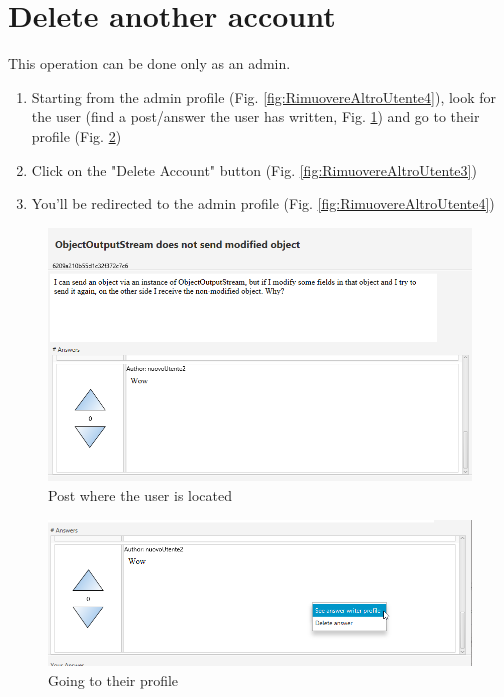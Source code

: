 \documentclass[11pt]{report}
\begin{document}
\section{Delete another account}
This operation can be done only as an admin.
\begin{enumerate}
    \item Starting from the admin profile (Fig. \ref{fig:RimuovereAltroUtente4}), look for the user (find a post/answer the user has written, Fig. \ref{fig:RimuovereAltroUtente1}) and go to their profile (Fig. \ref{fig:RimuovereAltroUtente2})
    \item Click on the "Delete Account" button (Fig. \ref{fig:RimuovereAltroUtente3})
    \item You'll be redirected to the admin profile (Fig. \ref{fig:RimuovereAltroUtente4})
\end{enumerate}
\begin{figure}[H]
  \centering
  \includegraphics[width=\textwidth,keepaspectratio=true]{img/user_manual/RimuovereAltroUtente1.png}
  \caption{Post where the user is located}
  \label{fig:RimuovereAltroUtente1}
\end{figure}
\begin{figure}[H]
  \centering
  \includegraphics[width=\textwidth,keepaspectratio=true]{img/user_manual/RimuovereAltroUtente2.png}
  \caption{Going to their profile}
  \label{fig:RimuovereAltroUtente2}
\end{figure}
\end{document}
